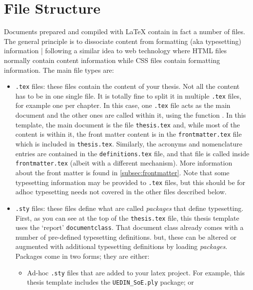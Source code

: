 \documentclass[11pt,twoside,openright]{report}
\begin{document}
\section{File Structure}

Documents prepared and compiled with \LaTeX{} contain in fact a number of files.
The general principle is to dissociate content from formatting (aka typesetting) information | following a similar idea to web technology where HTML files normally contain  content information while CSS files contain formatting information. The main file types are:

\begin{itemize}[noitemsep]
  \item \verb|.tex| files: these files contain the content of your thesis. Not all the content has to be in one single file. It is totally fine to split it in multiple \verb|.tex| files, for example one per chapter. In this case, one \verb|.tex| file acts as the main document and the other ones are called within it, using the function \verb||. In this template, the main document is the file \verb|thesis.tex| and, while most of the content is within it, the front matter content is in the \verb|frontmatter.tex| file which is included in \verb|thesis.tex|. Similarly, the acronyms and nomenclature entries are contained in the \verb|definitions.tex| file, and that file is called inside \verb|frontmatter.tex| (albeit with a different mechanism). More information about the front matter is found in \cref{subsec:frontmatter}.
  Note that some typesetting information may be provided to \verb|.tex| files, but this should be for adhoc typesetting needs not covered in the other files described below.
  
  \item \verb|.sty| files: these files define what are called \emph{packages} that define typesetting. First, as you can see at the top of the \verb|thesis.tex| file, this thesis template uses the `report' \verb|documentclass|. That document class already comes with a number of pre-defined typesetting definitions. but, these can be altered or augmented with additional typesetting definitions by loading \emph{packages}. Packages come in two forms; they are either:           
    \begin{itemize}[noitemsep]
        \item Ad-hoc \verb|.sty| files that are added to your latex project. For example, this thesis template includes the \verb|UEDIN_SoE.ply| package; or
        

\end{itemize}
\end{itemize}
\end{document}
